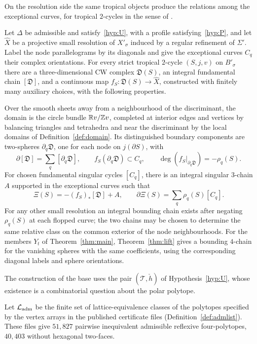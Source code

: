 On the resolution side the same tropical objects produce the relations among the exceptional curves, for tropical
$2$-cycles in the sense of \cite{CBM}.

\begin{mainthm}\label{thm:res}
Let $\Delta$ be admissible and satisfy~\ref{hyp:U}, with a profile satisfying~\ref{hyp:P}, and let $\widehat X$ be a
projective small resolution of $X'_\sigma$ induced by a regular refinement of $\Sigma'$. Label the node parallelograms
by its diagonals and give the exceptional curves $C_q$ their complex orientations. For every strict tropical
$2$-cycle $(S,j,v)$ on $B'_\sigma$ there are a three-dimensional CW complex $\mathfrak D(S)$, an integral fundamental
chain $[\mathfrak D]$, and a continuous map $f_S\colon\mathfrak D(S)\to\widehat X$, constructed with finitely many
auxiliary choices, with the following properties.

Over the smooth sheets away from a neighbourhood of the discriminant, the domain is the circle bundle
$\mathbb R v/\mathbb Z v$, completed at interior edges and vertices by balancing triangles and tetrahedra and near the discriminant
by the local domains of Definition~\ref{def:domain}. Its distinguished boundary components are two-spheres
$\partial_q\mathfrak D$, one for each node on $j(\partial S)$, with
\[
\partial[\mathfrak D]=\sum_q[\partial_q\mathfrak D],\qquad
f_S(\partial_q\mathfrak D)\subset C_q,\qquad
\deg(f_S|_{\partial_q\mathfrak D})=-\rho_q(S).
\]
For chosen fundamental singular cycles $[C_q]$, there is an integral singular $3$-chain $A$ supported in the exceptional
curves such that
\[
\Xi(S)=-(f_S)_*[\mathfrak D]+A,\qquad
\partial\Xi(S)=\sum_q\rho_q(S)[C_q].
\]
For any other small resolution an integral bounding chain exists after negating $\rho_q(S)$ at each flopped curve;
the two chains may be chosen to determine the same relative class on the common exterior of the node neighbourhoods.
For the members $Y_t$ of Theorem~\ref{thm:main}, Theorem~\ref{thm:lift} gives a bounding $4$-chain for the vanishing
spheres with the same coefficients, using the corresponding diagonal labels and sphere orientations.
\end{mainthm}

The construction of the base uses the pair $(\mathcal T,\check h)$ of Hypothesis~\ref{hyp:U}, whose existence is a
combinatorial question about the polar polytope.

Let $\mathcal L_{\rm adm}$ be the finite set of lattice-equivalence classes of the polytopes specified by the vertex
arrays in the published certificate files (Definition~\ref{def:admlist}). These files give $51{,}827$ pairwise
inequivalent admissible reflexive four-polytopes, $40{,}403$ without hexagonal two-faces.

